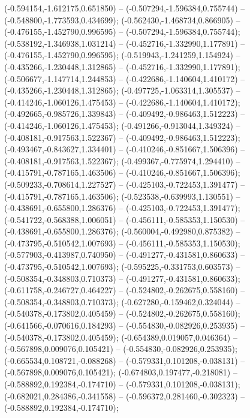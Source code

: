  (-0.594154,-1.612175,0.651850) -- (-0.507294,-1.596384,0.755744) -- (-0.548800,-1.773593,0.434699);
 (-0.562430,-1.468734,0.866905) -- (-0.476155,-1.452790,0.996595) -- (-0.507294,-1.596384,0.755744);
 (-0.538192,-1.346938,1.031214) -- (-0.452716,-1.332990,1.177891) -- (-0.476155,-1.452790,0.996595);
 (-0.519943,-1.241259,1.154924) -- (-0.435266,-1.230448,1.312865) -- (-0.452716,-1.332990,1.177891);
 (-0.506677,-1.147714,1.244853) -- (-0.422686,-1.140604,1.410172) -- (-0.435266,-1.230448,1.312865);
 (-0.497725,-1.063314,1.305537) -- (-0.414246,-1.060126,1.475453) -- (-0.422686,-1.140604,1.410172);
 (-0.492665,-0.985726,1.339843) -- (-0.409492,-0.986463,1.512223) -- (-0.414246,-1.060126,1.475453);
 (-0.491266,-0.913044,1.349324) -- (-0.408181,-0.917563,1.522367) -- (-0.409492,-0.986463,1.512223);
 (-0.493467,-0.843627,1.334401) -- (-0.410246,-0.851667,1.506396) -- (-0.408181,-0.917563,1.522367);
 (-0.499367,-0.775974,1.294410) -- (-0.415791,-0.787165,1.463506) -- (-0.410246,-0.851667,1.506396);
 (-0.509233,-0.708614,1.227527) -- (-0.425103,-0.722453,1.391477) -- (-0.415791,-0.787165,1.463506);
 (-0.523538,-0.639993,1.130551) -- (-0.438691,-0.655800,1.286376) -- (-0.425103,-0.722453,1.391477);
 (-0.541722,-0.568388,1.006051) -- (-0.456111,-0.585353,1.150530) -- (-0.438691,-0.655800,1.286376);
 (-0.560004,-0.492980,0.875382) -- (-0.473795,-0.510542,1.007693) -- (-0.456111,-0.585353,1.150530);
 (-0.577903,-0.413987,0.740950) -- (-0.491277,-0.431581,0.860633) -- (-0.473795,-0.510542,1.007693);
 (-0.595225,-0.331753,0.603573) -- (-0.508354,-0.348803,0.710373) -- (-0.491277,-0.431581,0.860633);
 (-0.611758,-0.246727,0.464227) -- (-0.524802,-0.262675,0.558160) -- (-0.508354,-0.348803,0.710373);
 (-0.627280,-0.159462,0.324044) -- (-0.540378,-0.173802,0.405459) -- (-0.524802,-0.262675,0.558160);
 (-0.641566,-0.070616,0.184293) -- (-0.554830,-0.082926,0.253935) -- (-0.540378,-0.173802,0.405459);
 (-0.654389,0.019057,0.046364) -- (-0.567898,0.009076,0.105421) -- (-0.554830,-0.082926,0.253935);
 (-0.665534,0.108721,-0.088268) -- (-0.579331,0.101208,-0.038131) -- (-0.567898,0.009076,0.105421);
 (-0.674803,0.197477,-0.218081) -- (-0.588892,0.192384,-0.174710) -- (-0.579331,0.101208,-0.038131);
 (-0.682021,0.284386,-0.341558) -- (-0.596372,0.281460,-0.302323) -- (-0.588892,0.192384,-0.174710);
